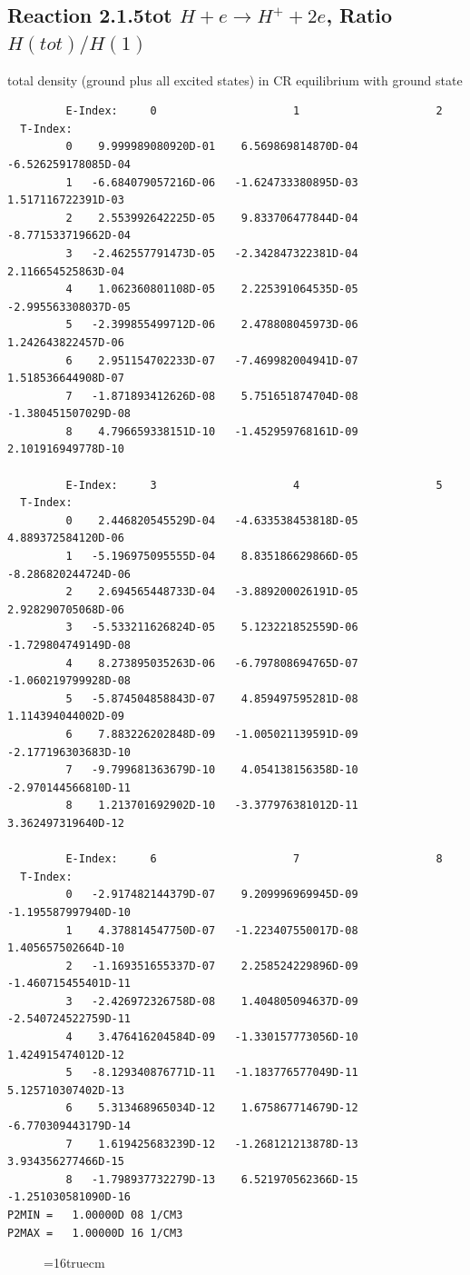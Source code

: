 \documentclass[12pt,dvipdfmx]{article}
\begin{document}
\newpage
\subsection{
Reaction 2.1.5tot $ H + e \rightarrow H^+ + 2e$, Ratio $H(tot)/H(1)$
}

total density (ground plus all excited states) in CR equilibrium with ground state

\begin{small}\begin{verbatim}
         E-Index:     0                     1                     2
  T-Index:
         0    9.999989080920D-01    6.569869814870D-04   -6.526259178085D-04
         1   -6.684079057216D-06   -1.624733380895D-03    1.517116722391D-03
         2    2.553992642225D-05    9.833706477844D-04   -8.771533719662D-04
         3   -2.462557791473D-05   -2.342847322381D-04    2.116654525863D-04
         4    1.062360801108D-05    2.225391064535D-05   -2.995563308037D-05
         5   -2.399855499712D-06    2.478808045973D-06    1.242643822457D-06
         6    2.951154702233D-07   -7.469982004941D-07    1.518536644908D-07
         7   -1.871893412626D-08    5.751651874704D-08   -1.380451507029D-08
         8    4.796659338151D-10   -1.452959768161D-09    2.101916949778D-10

         E-Index:     3                     4                     5
  T-Index:
         0    2.446820545529D-04   -4.633538453818D-05    4.889372584120D-06
         1   -5.196975095555D-04    8.835186629866D-05   -8.286820244724D-06
         2    2.694565448733D-04   -3.889200026191D-05    2.928290705068D-06
         3   -5.533211626824D-05    5.123221852559D-06   -1.729804749149D-08
         4    8.273895035263D-06   -6.797808694765D-07   -1.060219799928D-08
         5   -5.874504858843D-07    4.859497595281D-08    1.114394044002D-09
         6    7.883226202848D-09   -1.005021139591D-09   -2.177196303683D-10
         7   -9.799681363679D-10    4.054138156358D-10   -2.970144566810D-11
         8    1.213701692902D-10   -3.377976381012D-11    3.362497319640D-12

         E-Index:     6                     7                     8
  T-Index:
         0   -2.917482144379D-07    9.209996969945D-09   -1.195587997940D-10
         1    4.378814547750D-07   -1.223407550017D-08    1.405657502664D-10
         2   -1.169351655337D-07    2.258524229896D-09   -1.460715455401D-11
         3   -2.426972326758D-08    1.404805094637D-09   -2.540724522759D-11
         4    3.476416204584D-09   -1.330157773056D-10    1.424915474012D-12
         5   -8.129340876771D-11   -1.183776577049D-11    5.125710307402D-13
         6    5.313468965034D-12    1.675867714679D-12   -6.770309443179D-14
         7    1.619425683239D-12   -1.268121213878D-13    3.934356277466D-15
         8   -1.798937732279D-13    6.521970562366D-15   -1.251030581090D-16
P2MIN =   1.00000D 08 1/CM3
P2MAX =   1.00000D 16 1/CM3

\end{verbatim}\end{small}
\begin{figure} \label{2.1.5tot}
\epsfxsize=16truecm
\end{figure}
\end{document}
